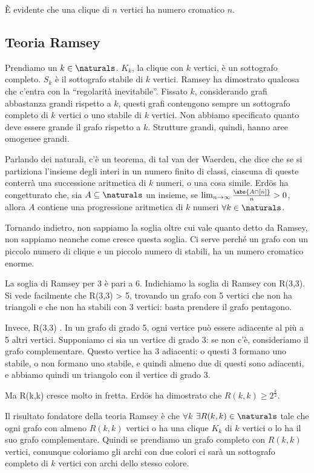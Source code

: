 	\`E evidente che una clique di $n$ vertici ha numero cromatico $n$.

	\subsection{Teoria Ramsey}

	Prendiamo un $k \in \naturals$.
	$K_k$, la clique con $k$ vertici, \`e un sottografo completo.
	$S_k$ \`e il sottografo stabile di $k$ vertici.
	Ramsey ha dimostrato qualcosa che c'entra con la ``regolarit\`a inevitabile''.
	Fissato $k$, considerando grafi abbastanza grandi rispetto a $k$, questi grafi contengono sempre un sottografo completo di $k$ vertici o uno stabile di $k$ vertici.
	Non abbiamo specificato quanto deve essere grande il grafo rispetto a $k$.
	Strutture grandi, quindi, hanno aree omogenee grandi.

	Parlando dei naturali, c'\`e un teorema, di tal van der Waerden, che dice che se si partiziona l'insieme degli interi in un numero finito di classi, ciascuna di queste conterr\`a una successione aritmetica di $k$ numeri, o una cosa simile.
	Erd\"os ha congetturato che, sia $A \subseteq \naturals$ un insieme, se $\lim_{n \to \infty} \frac{\abs{A \cap [n]}}{n} > 0$, allora $A$ contiene una progressione aritmetica di $k$ numeri $\forall k \in \naturals$.

	Tornando indietro, non sappiamo la soglia oltre cui vale quanto detto da Ramsey, non sappiamo neanche come cresce questa soglia.
	Ci serve perch\'e un grafo con un piccolo numero di clique e un piccolo numero di stabili, ha un numero cromatico enorme.

	La soglia di Ramsey per 3 \`e pari a 6.
	Indichiamo la soglia di Ramsey con R(3,3).
	Si vede facilmente che R(3,3) > 5, trovando un grafo con 5 vertici che non ha triangoli e che non ha stabili con 3 vertici: basta prendere il grafo pentagono.

	Invece, R(3,3) .
	In un grafo di grado 5, ogni vertice pu\`o essere adiacente al pi\`u a 5 altri vertici.
	Supponiamo ci sia un vertice di grado 3: se non c'\`e, consideriamo il grafo complementare.
	Questo vertice ha 3 adiacenti: o questi 3 formano uno stabile, o non formano uno stabile, e quindi almeno due di questi sono adiacenti, e abbiamo quindi un triangolo con il vertice di grado 3.

	Ma R(k,k) cresce molto in fretta.
	Erd\"os ha dimostrato che $R(k,k) \ge 2^{\frac{k}{2}}$.

	Il risultato fondatore della teoria Ramsey \`e che $\forall k$ $\exists R(k,k) \in \naturals$ tale che ogni grafo con almeno $R(k,k)$ vertici o ha una clique $K_k$ di $k$ vertici o lo ha il suo grafo complementare.
	Quindi se prendiamo un grafo completo con $R(k,k)$ vertici, comunque coloriamo gli archi con due colori ci sar\`a un sottografo completo di $k$ vertici con archi dello stesso colore.

